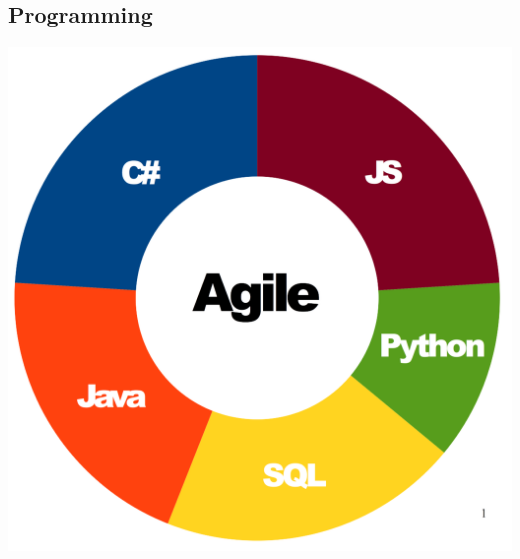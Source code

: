\documentclass[]{cv-class}
\begin{document}
\begin{aside}
  \section{Programming}
    \includegraphics[scale=0.22]{img/programming.png}
    ~

\end{aside}
\end{document}
